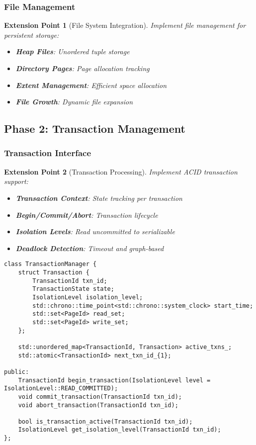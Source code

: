 \documentclass[12pt,a4paper]{article}
\newtheorem{extension}{Extension Point}[section]
\begin{document}
\subsubsection{File Management}

\begin{extension}[File System Integration]
Implement file management for persistent storage:

\begin{itemize}
    \item \textbf{Heap Files}: Unordered tuple storage
    \item \textbf{Directory Pages}: Page allocation tracking
    \item \textbf{Extent Management}: Efficient space allocation
    \item \textbf{File Growth}: Dynamic file expansion
\end{itemize}
\end{extension}

\subsection{Phase 2: Transaction Management}

\subsubsection{Transaction Interface}

\begin{extension}[Transaction Processing]
Implement ACID transaction support:

\begin{itemize}
    \item \textbf{Transaction Context}: State tracking per transaction
    \item \textbf{Begin/Commit/Abort}: Transaction lifecycle
    \item \textbf{Isolation Levels}: Read uncommitted to serializable
    \item \textbf{Deadlock Detection}: Timeout and graph-based
\end{itemize}
\end{extension}

\begin{lstlisting}[style=cpp, caption=Transaction Manager Interface]
class TransactionManager {
    struct Transaction {
        TransactionId txn_id;
        TransactionState state;
        IsolationLevel isolation_level;
        std::chrono::time_point<std::chrono::system_clock> start_time;
        std::set<PageId> read_set;
        std::set<PageId> write_set;
    };
    
    std::unordered_map<TransactionId, Transaction> active_txns_;
    std::atomic<TransactionId> next_txn_id_{1};
    
public:
    TransactionId begin_transaction(IsolationLevel level = IsolationLevel::READ_COMMITTED);
    void commit_transaction(TransactionId txn_id);
    void abort_transaction(TransactionId txn_id);
    
    bool is_transaction_active(TransactionId txn_id);
    IsolationLevel get_isolation_level(TransactionId txn_id);
};
\end{lstlisting}
\end{document}
